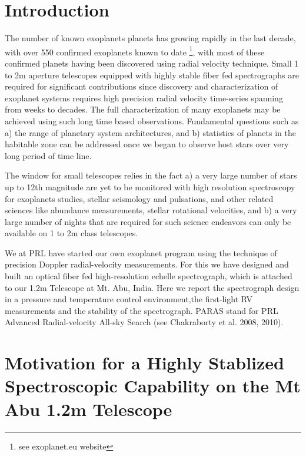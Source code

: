 \documentclass[12pt,preprint]{emulateapj}
\begin{document}

\section{Introduction}
\label{introduction}
\indent The number of known exoplanets planets has growing rapidly in the last decade, with over 550
confirmed exoplanets known to date \footnote{see exoplanet.eu website}, with most of these confirmed
planets having been discovered using radial velocity technique. Small 1 to 2m aperture telescopes equipped
with highly stable fiber fed spectrographs are required for significant contributions since discovery and
characterization of exoplanet systems requires high precision radial velocity time-series spanning from weeks
to decades. The full characterization of many exoplanets may be achieved using such long time based observations.
Fundamental questions such as a) the range of planetary system architectures, and b) statistics of planets
in the habitable zone can be addressed once we began to observe host stars over very long period of time line.

The window for small telescopes relies in the fact a) a very large number of stars up to 12th magnitude
are yet to be monitored with high resolution spectroscopy for exoplanets studies, stellar seismology and
pulsations, and other related sciences like abundance measurements, stellar rotational velocities, and b)
a very large number of nights that are required for such science endeavors can only be available on 1 to 2m
class telescopes.

We at PRL have started our own exoplanet program using the technique of precision Doppler radial-velocity
measurements. For this we have designed and built an optical fiber fed high-resolution echelle spectrograph,
which is attached to our 1.2m Telescope at Mt. Abu, India. Here we report the spectrograph design in a pressure 
and temperature control environment,the first-light RV measurements and the stability of the spectrograph. 
PARAS stand for PRL Advanced Radial-velocity All-sky Search (see Chakraborty et al. 2008, 2010).


\section{Motivation for a Highly Stablized  Spectroscopic Capability on the Mt Abu 1.2m Telescope}
\label{motivation}
\end{document}
